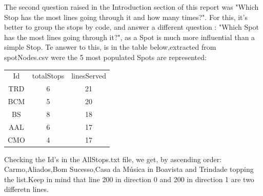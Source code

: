 \documentclass[12pt]{article}
\begin{document}
\begin{multicols}{2}
The second question raised in the Introduction section of this report was "Which Stop has the most lines going through it and how many times?". For this, it's better to group the stops by code, and answer a different question : "Which Spot has the most lines going through it?", as a Spot is much more influential than a simple Stop. Te answer to this, is in the table below,extracted from spotNodes.csv were the 5 most populated Spots are represented:
\begin{center}
\begin{tabular}[h]{ |c|c|c| }
\hline
    Id  & totalStops & linesServed\\
    TRD & 6          & 21 \\
    BCM & 5          & 20 \\
    BS  & 8          & 18 \\
    AAL & 6          & 17 \\
    CMO & 4          & 17 \\
\hline
\end{tabular}
\end{center}
Checking the Id's in the AllStops.txt file, we get, by ascending order:
Carmo,Aliados,Bom Sucesso,Casa da Música in Boavista and Trindade topping the list.Keep in mind that line 200 in direction 0 and 200 in direction 1 are two differetn lines.


\end{multicols}
\end{document}
